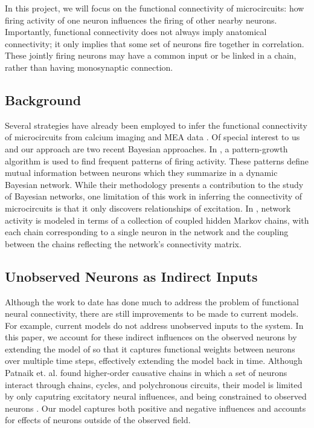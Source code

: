 \documentclass{article}
\begin{document}
In this project, we will focus on the functional connectivity of
microcircuits: how firing activity of one neuron influences the
firing of other nearby neurons.  Importantly, functional connectivity
does not always imply anatomical connectivity; it only implies that
some set of neurons fire together in correlation.  These jointly
firing neurons may have a common input or be linked in a chain,
rather than having monosynaptic connection.

\subsection{Background}

Several strategies have already been employed to infer the functional
connectivity of microcircuits from calcium imaging and MEA data
\citep{Gerwinn2010, takahashi2007, aguiar2009}. Of special interest
to us and our approach are two recent Bayesian approaches. In
\citep{patnaik2011}, a pattern-growth algorithm is used to find
frequent patterns of firing activity. These patterns define mutual
information between neurons which they summarize in a dynamic
Bayesian network. While their methodology presents a contribution
to the study of Bayesian networks, one limitation of this work in
inferring the connectivity of microcircuits is that it only discovers
relationships of excitation. In \citep{mishchencko2011}, network
activity is modeled in terms of a collection of coupled hidden
Markov chains, with each chain corresponding to a single neuron in
the network and the coupling between the chains reflecting the
network’s connectivity matrix. 

\subsection{Unobserved Neurons as Indirect Inputs}

Although the work to date has done much to address the problem of
functional neural connectivity, there are still improvements to be
made to current models. For example, current models do not address
unobserved inputs to the system. In this paper, we account for these indirect influences on the
observed neurons by extending the model of \citep{mishchencko2011}
so that it captures functional weights between neurons over multiple
time steps, effectively extending the model back in time. Although Patnaik
et.  al. found higher-order causative chains in which a set of
neurons interact through chains, cycles,
and polychronous circuits, their model is
limited by only caputring excitatory neural influences, and being
constrained to observed neurons  \citep{patnaik2011}.  Our model captures both positive
and negative influences and accounts for effects of neurons
outside of the observed field.
\end{document}
